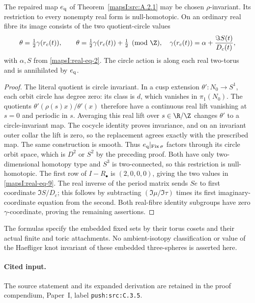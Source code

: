 \begin{proposition}\label{mapsI:src:A.3.4}
The repaired map $e_{\rm q}$ of Theorem~\ref{mapsI:src:A.2.1} may be chosen $\rho$-invariant. Its restriction to
every nonempty real form is null-homotopic. On an ordinary real fibre
its image consists of the two quotient-circle values
\[
 \theta=\tfrac12\gamma(r_c(t)),\qquad
 \theta=\tfrac12\gamma(r_c(t))+\tfrac12\pmod\Z,
 \quad
 \gamma(r_c(t))=\alpha+\frac{\Im S(t)}{D_c(t)},
 \label{mapsI:real-eq-9}
\]
with $\alpha,S$ from \eqref{mapsI:real-eq-2}. The circle action is along each real
two-torus and is annihilated by $e_{\rm q}$.
\end{proposition}


\begin{proof}
The literal quotient is circle invariant. In a cusp extension
$\theta':N_0\to S^1$, each orbit circle has degree zero: its class is
$d$, which vanishes in $\pi_1(N_0)$. The quotients
$\theta'(\rho(s)x)/\theta'(x)$ therefore have a continuous real lift
vanishing at $s=0$ and periodic in $s$. Averaging this real lift over
$s\in\R/\Z$ changes $\theta'$ to a circle-invariant map. The cocycle
identity proves invariance, and on an invariant outer collar the lift
is zero, so the replacement agrees exactly with the prescribed map.
The same construction is smooth. Thus $e_{\rm q}|_{\operatorname{Fix}\sigma}$
factors through its circle orbit space, which is $D^2$ or $S^2$ by the
preceding proof. Both have only two-dimensional homotopy type and
$S^3$ is two-connected, so this restriction is null-homotopic.
The first row of $I-R_\bullet$ is $(2,0,0,0)$, giving the two values
in \eqref{mapsI:real-eq-9}. The real inverse of the period matrix sends $S e$ to
first coordinate $\Im S/D_c$; this follows by subtracting
$(\Im\mu/\Im\tau)$ times its first imaginary-coordinate equation
from the second. Both real-fibre identity subgroups have zero
$\gamma$-coordinate, proving the remaining assertions.
\end{proof}

The formulas specify the embedded fixed sets by their torus cosets and
their actual finite and toric attachments. No ambient-isotopy
classification or value of the Haefliger knot invariant of these
embedded three-spheres is asserted here.



\paragraph{Cited input.} \label{push:src:C.3.5}\label{mapsI:closing:eq:C-explicit-closing}\label{mapsI:closing:eq:C-twelve-scalar}The source statement and its expanded derivation are retained in the proof compendium, Paper~I, label \nolinkurl{push:src:C.3.5}.\par

